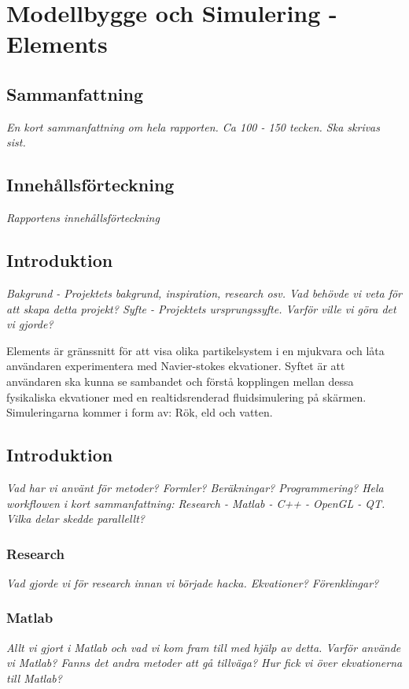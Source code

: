\documentclass[a4paper,12pt,twoside,swedish]{report}
\begin{document}
\pagestyle{plain}

\setcounter{page}{1}

\chapter{Modellbygge och Simulering - Elements}

\section{Sammanfattning}
\textit{En kort sammanfattning om hela rapporten. Ca 100 - 150 tecken. Ska skrivas sist.}

\section{Innehållsförteckning}
\textit{Rapportens innehållsförteckning}

\section{Introduktion}
\textit{Bakgrund - Projektets bakgrund, inspiration, research osv. Vad behövde vi veta för att skapa detta projekt?
Syfte - Projektets ursprungssyfte. Varför ville vi göra det vi gjorde?}

Elements är gränssnitt för att visa olika partikelsystem i en mjukvara och låta användaren experimentera med Navier-stokes ekvationer. Syftet är att användaren ska kunna se sambandet och förstå kopplingen mellan dessa fysikaliska ekvationer med en realtidsrenderad fluidsimulering på skärmen. Simuleringarna kommer i form av: Rök, eld och vatten.

\section{Introduktion}
\textit{Vad har vi använt för metoder? Formler? Beräkningar? Programmering? Hela workflowen i kort sammanfattning: Research - Matlab - C++ - OpenGL - QT. Vilka delar skedde parallellt?}

\subsection{Research}
\textit{Vad gjorde vi för research innan vi började hacka. Ekvationer? Förenklingar?}

\subsection{Matlab}
\textit{Allt vi gjort i Matlab och vad vi kom fram till med hjälp av detta. Varför använde vi Matlab? Fanns det andra metoder att gå tillväga? Hur fick vi över ekvationerna till Matlab?}
\end{document}
